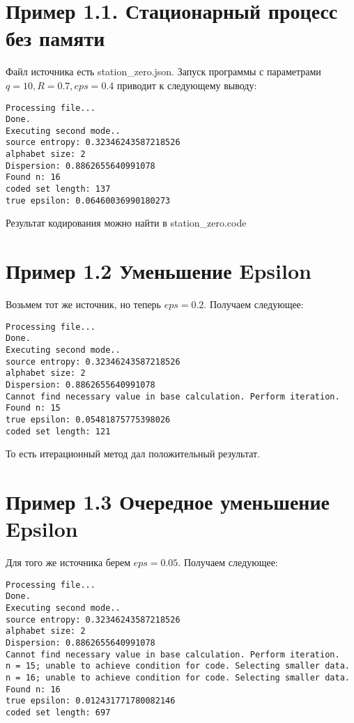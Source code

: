 \documentclass{article}
\begin{document}
\section{Пример 1.1. Стационарный процесс без памяти}

Файл источника есть station\_zero.json. Запуск программы с параметрами $q=10, R=0.7, eps=0.4$ приводит к следующему выводу:

\begin{verbatim}
Processing file...
Done.
Executing second mode..
source entropy: 0.32346243587218526
alphabet size: 2
Dispersion: 0.8862655640991078
Found n: 16
coded set length: 137
true epsilon: 0.06460036990180273
\end{verbatim}

Результат кодирования можно найти в station\_zero.code

\section{Пример 1.2 Уменьшение Epsilon}

Возьмем тот же источник, но теперь $eps=0.2$. Получаем следующее:

\begin{verbatim}
Processing file...
Done.
Executing second mode..
source entropy: 0.32346243587218526
alphabet size: 2
Dispersion: 0.8862655640991078
Cannot find necessary value in base calculation. Perform iteration.
Found n: 15
true epsilon: 0.05481875775398026
coded set length: 121
\end{verbatim}

То есть итерационный метод дал положительный результат.

\section{Пример 1.3 Очередное уменьшение Epsilon}

Для того же источника берем $eps=0.05$. Получаем следующее:

\begin{verbatim}
Processing file...
Done.
Executing second mode..
source entropy: 0.32346243587218526
alphabet size: 2
Dispersion: 0.8862655640991078
Cannot find necessary value in base calculation. Perform iteration.
n = 15; unable to achieve condition for code. Selecting smaller data.
n = 16; unable to achieve condition for code. Selecting smaller data.
Found n: 16
true epsilon: 0.012431771780082146
coded set length: 697
\end{verbatim}
\end{document}
